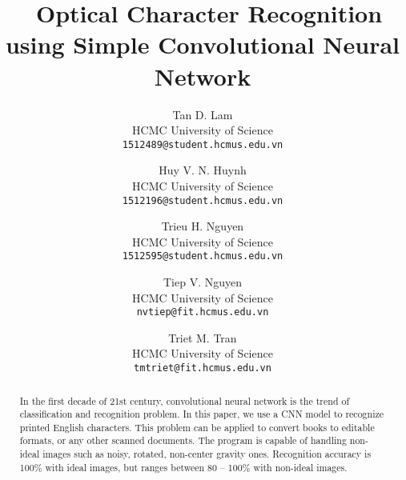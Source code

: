 \documentclass[10pt,twocolumn,letterpaper]{article}
\begin{document}
\title{\ Optical Character Recognition using Simple Convolutional Neural Network}

\author{Tan D. Lam\\
HCMC University of Science\\
{\tt\small 1512489@student.hcmus.edu.vn}
\and
Huy V. N. Huynh\\
HCMC University of Science\\
{\tt\small 1512196@student.hcmus.edu.vn}
\and
Trieu H. Nguyen\\
HCMC University of Science\\
{\tt\small 1512595@student.hcmus.edu.vn}
\and
Tiep V. Nguyen\\
HCMC University of Science\\
{\tt\small nvtiep@fit.hcmus.edu.vn}
\and
Triet M. Tran\\
HCMC University of Science\\
{\tt\small tmtriet@fit.hcmus.edu.vn}
}

\maketitle

\begin{abstract}
In the first decade of 21st century, convolutional neural network is the trend of classification and recognition problem. In this paper, we use a CNN model to recognize printed English characters. This problem can be applied to convert books to editable formats, or any other scanned documents. The program is capable of handling non-ideal images such as noisy, rotated, non-center gravity ones. Recognition accuracy is 100\% with ideal images, but ranges between 80 – 100\% with non-ideal images.
\end{abstract}

\end{document}
